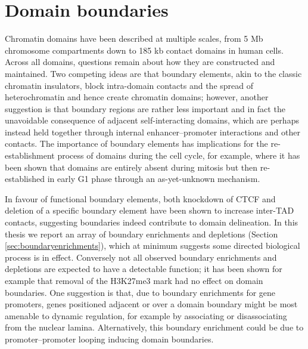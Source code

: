 \documentclass[a4paper,11pt,oneside]{book}
\begin{document}


\section{Domain boundaries}


Chromatin domains have been described at multiple scales, from 5 Mb chromosome compartments\cite{Lieberman2009} down to 185 kb contact domains\cite{Rao2014} in human cells. Across all domains, questions remain about how they are constructed and maintained. Two competing ideas are that boundary elements, akin to the classic chromatin insulators, block intra-domain contacts and the spread of heterochromatin and hence create chromatin domains; however, another suggestion is that boundary regions are rather less important and in fact the unavoidable consequence of adjacent self-interacting domains, which are perhaps instead held together through internal enhancer--promoter interactions and other contacts. The importance of boundary elements has implications for the re-establishment process of domains during the cell cycle, for example, where it has been shown that domains are entirely absent during mitosis but then re-established in early G1 phase through an as-yet-unknown mechanism.\cite{Naumova2013} 

In favour of functional boundary elements, both knockdown of CTCF\cite{Zuin2013} and deletion of a specific boundary element\cite{Nora2012} have been shown to increase inter-TAD contacts, suggesting boundaries indeed contribute to domain delineation. In this thesis we report an array of boundary enrichments and depletions (Section \ref{sec:boundaryenrichments}), which at minimum suggests some directed biological process is in effect. Conversely not all observed boundary enrichments and depletions are expected to have a detectable function; it has been shown for example that removal of the H3K27me3 mark had no effect on domain boundaries.\cite{Nora2012} One suggestion is that, due to boundary enrichments for gene promoters,\cite{Dixon2012} genes positioned adjacent or over a domain boundary might be most amenable to dynamic regulation, for example by associating or disassociating from the nuclear lamina. Alternatively, this boundary enrichment could be due to promoter--promoter looping inducing domain boundaries.\cite{Li2012a, Sanyal2012, Sexton2015}
\end{document}
